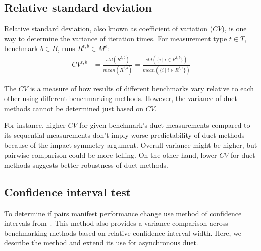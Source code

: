 \subsection{Relative standard deviation}
\label{sec:cv}

Relative standard deviation, also known as coefficient of variation ($CV$), is one way to determine the variance of iteration times.
For measurement type $t \in T$, benchmark $b \in B$, runs $R^{t, b} \in M^e$:
\begin{align*}
CV^{t, b} &= \frac{std(R^{t, b})}{mean(R^{t, b})} = \frac{std(\{i~|~i \in R^{t, b}\})}{mean(\{i~|~i \in R^{t, b}\})}
\end{align*}

The $CV$ is a measure of how results of different benchmarks vary relative to each other using different benchmarking methods.
However, the variance of duet methods cannot be determined just based on $CV$.

For instance, higher $CV$ for given benchmark's duet measurements compared to its sequential measurements don't imply worse predictability of duet methods because of the impact symmetry argument.
Overall variance might be higher, but pairwise comparison could be more telling.
On the other hand, lower $CV$ for duet methods suggests better robustness of duet methods.

\subsection{Confidence interval test}
\label{sec:ci_test}

To determine if pairs manifest performance change use method of confidence intervals from~\citet{bulej2020duet}.
This method also provides a variance comparison across benchmarking methods based on relative confidence interval width.
Here, we describe the method and extend its use for asynchronous duet.

